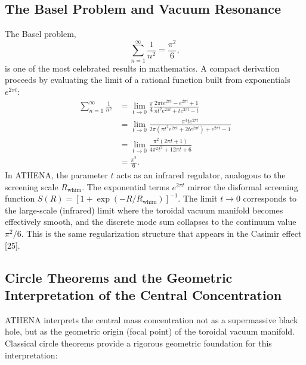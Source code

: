 \documentclass[12pt, a4paper]{article}
\begin{document}
\subsection{The Basel Problem and Vacuum Resonance}
The Basel problem,
\begin{equation}
\sum_{n=1}^{\infty} \frac{1}{n^2} = \frac{\pi^2}{6},
\end{equation}
is one of the most celebrated results in mathematics. A compact derivation proceeds by evaluating the limit of a rational function built from exponentials $e^{2\pi t}$:
\begin{align}
\sum_{n=1}^{\infty} \frac{1}{n^2} &= \lim_{t\to 0} \frac{\pi}{4} \frac{2\pi t e^{2\pi t} - e^{2\pi t} + 1}{\pi t^2 e^{2\pi t} + t e^{2\pi t} - t} \\
&= \lim_{t\to 0} \frac{\pi^3 t e^{2\pi t}}{2\pi \left(\pi t^2 e^{2\pi t} + 2t e^{2\pi t}\right) + e^{2\pi t} - 1} \\
&= \lim_{t\to 0} \frac{\pi^2 (2\pi t + 1)}{4\pi^2 t^2 + 12\pi t + 6} \\
&= \frac{\pi^2}{6}.
\end{align}
In ATHENA, the parameter $t$ acts as an infrared regulator, analogous to the screening scale $R_{\mathrm{whim}}$. The exponential terms $e^{2\pi t}$ mirror the disformal screening function $S(R) = [1 + \exp(-R/R_{\mathrm{whim}})]^{-1}$. The limit $t\to 0$ corresponds to the large-scale (infrared) limit where the toroidal vacuum manifold becomes effectively smooth, and the discrete mode sum collapses to the continuum value $\pi^2/6$. This is the same regularization structure that appears in the Casimir effect [25].

\subsection{Circle Theorems and the Geometric Interpretation of the Central Concentration}
ATHENA interprets the central mass concentration not as a supermassive black hole, but as the geometric origin (focal point) of the toroidal vacuum manifold. Classical circle theorems provide a rigorous geometric foundation for this interpretation:
\end{document}
